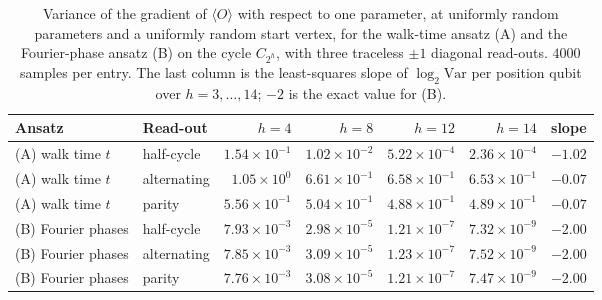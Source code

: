 \begin{table}[htbp]
\centering\small
\caption[Gradient variance of the walk ans\"atze]{Variance of the gradient of $\langle O\rangle$ with respect to one parameter, at uniformly random parameters and a uniformly random start vertex, for the walk-time ansatz (A) and the Fourier-phase ansatz (B) on the cycle $C_{2^h}$, with three traceless $\pm1$ diagonal read-outs. $4000$ samples per entry. The last column is the least-squares slope of $\log_2\mathrm{Var}$ per position qubit over $h = 3, \ldots, 14$; $-2$ is the exact value for (B).}
\label{tab:gradvarctqw}
\begin{tabular}{llrrrrr}
\hline
Ansatz & Read-out & $h=4$ & $h=8$ & $h=12$ & $h=14$ & slope \\
\hline
(A) walk time $t$ & half-cycle & $1.54\times10^{-1}$ & $1.02\times10^{-2}$ & $5.22\times10^{-4}$ & $2.36\times10^{-4}$ & $-1.02$ \\
(A) walk time $t$ & alternating & $1.05\times10^{0}$ & $6.61\times10^{-1}$ & $6.58\times10^{-1}$ & $6.53\times10^{-1}$ & $-0.07$ \\
(A) walk time $t$ & parity & $5.56\times10^{-1}$ & $5.04\times10^{-1}$ & $4.88\times10^{-1}$ & $4.89\times10^{-1}$ & $-0.07$ \\
(B) Fourier phases & half-cycle & $7.93\times10^{-3}$ & $2.98\times10^{-5}$ & $1.21\times10^{-7}$ & $7.32\times10^{-9}$ & $-2.00$ \\
(B) Fourier phases & alternating & $7.85\times10^{-3}$ & $3.09\times10^{-5}$ & $1.23\times10^{-7}$ & $7.52\times10^{-9}$ & $-2.00$ \\
(B) Fourier phases & parity & $7.76\times10^{-3}$ & $3.08\times10^{-5}$ & $1.21\times10^{-7}$ & $7.47\times10^{-9}$ & $-2.00$ \\
\hline
\end{tabular}
\end{table}
